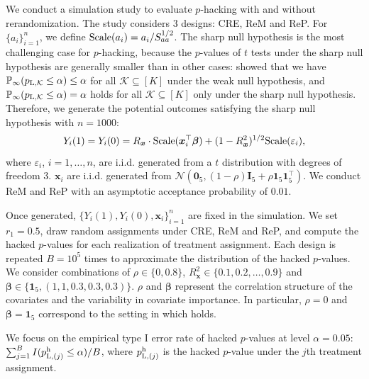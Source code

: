 \documentclass[12pt]{article}
\newcommand{\Lin}{\textnormal{L}}
\newcommand{\Prob}{\mathbb{P}}
\newcommand{\mk}{\mathcal{K}}
\newcommand{\bs}{\boldsymbol}
\begin{document}
We conduct a simulation study to evaluate  $p$-hacking with and without rerandomization. The study considers $3$ designs: CRE, ReM and ReP. For $\{a_i\}_{i=1}^n$, we define $\textnormal{Scale}(a_i) = a_i/S_{aa}^{1/2}$. The sharp null hypothesis is the most challenging case for $p$-hacking, because the $p$-values of $t$ tests under the sharp null hypothesis are generally smaller than in other cases: \citet{zhao2021covariate} 
showed that we have $\Prob_{\infty}(p_{\Lin,\mk}\leq \alpha)\leq \alpha$ for all $\mk\subseteq [K]$ under the weak null hypothesis, and $\Prob_{\infty}(p_{\Lin,\mk}\leq \alpha) = \alpha$ 
holds for all $\mk\subseteq [K]$ only under the sharp null hypothesis. Therefore, we generate the potential outcomes satisfying the sharp null hypothesis with $n=1000$:
\[
Y_i(1) = Y_i(0)  = R_{\bs{x}} \cdot \textnormal{Scale}(\bs{x}_i^\top \bs{\beta}) + (1-R_{\bs{x}}^2)^{1/2}\textnormal{Scale}(\varepsilon_i),
\]
where  $\varepsilon_i$, $i=1,\ldots,n$, are i.i.d. generated from a $t$ distribution with degrees of freedom $3$. $\bs{x}_i$ are i.i.d. generated from $\mathcal{N}(\bs{0}_5, (1-\rho)\bs{I}_5 + \rho \bs{1}_5\bs{1}_5^\top)$. We conduct ReM and ReP with an asymptotic acceptance probability of $0.01$.

Once generated, $\{Y_i(1),Y_i(0),\bs{x}_i\}_{i=1}^n$ are fixed in the simulation. We set  $r_1=0.5$, draw random assignments under CRE, ReM and ReP, and compute the hacked $p$-values for each realization of treatment assignment. Each design is repeated $B=10^5$ times to approximate the distribution of the hacked $p$-values. We consider combinations of $\rho \in \{0, 0.8\}$, $R_{\bs{x}}^2 \in \{0.1, 0.2, \ldots,0.9\}$ and $\bs{\beta} \in \{\bs{1}_5,(1,1,0.3,0.3,0.3)\}$. $\rho$ and $\bs{\beta}$ represent the correlation structure of the covariates and the variability in covariate importance. In particular, $\rho = 0$ and $\bs{\beta} = \bs{1}_5$ correspond to the setting in which  holds.

We focus on the empirical type I error rate of hacked $p$-values at level $\alpha=0.05$: $\sum_{j=1}^B I(p_{\textnormal{L},(j)}^{\textnormal{h}} \leq \alpha)/B$, where $p_{\textnormal{L},(j)}^{\textnormal{h}}$ is the hacked $p$-value under the $j$th treatment assignment. 
\end{document}
